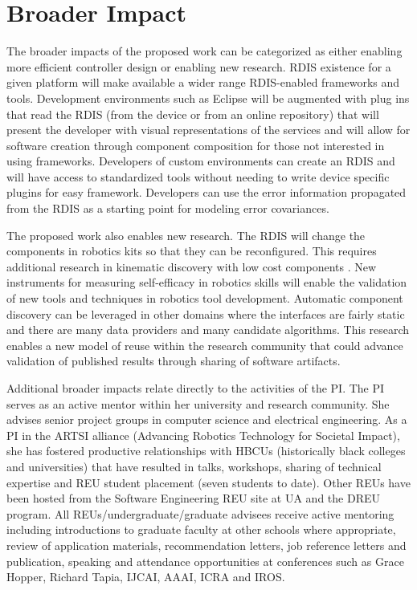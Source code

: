 
\section{Broader Impact}\label{sec:bi}

The broader impacts of the proposed work can be categorized as either enabling more efficient controller design or enabling new research.   RDIS existence for a given platform will make available a wider range RDIS-enabled frameworks and tools.  Development environments such as Eclipse will be augmented with plug ins that read the RDIS (from the device or from an online repository) that will present the developer with visual representations of the services and will allow for software creation through component composition for those not interested in using frameworks.  Developers of custom environments can create an RDIS and will have access to standardized tools without needing to write device specific plugins for easy framework.  Developers can use the error information propagated from the RDIS as a starting point for modeling error covariances.  

The proposed work also enables new research.  The RDIS will change the components in robotics kits so that they can be reconfigured.  This requires additional research in kinematic discovery with low cost components \cite{Croxell2008}.  New instruments for measuring self-efficacy in robotics skills will enable the validation of new tools and techniques in robotics tool development.  Automatic component discovery can be leveraged in other domains where the interfaces are fairly static and there are many data providers and many candidate algorithms.  This research enables a new model of reuse within the research community that could advance validation of published results through sharing of software artifacts. 

Additional broader impacts relate directly to the activities of the PI.  The PI serves as an active mentor within her university and research community.  She advises senior project groups in computer science and electrical engineering.  As a PI in the ARTSI alliance (Advancing Robotics Technology for Societal Impact), she has fostered productive relationships with HBCUs (historically black colleges and universities) that have resulted in talks, workshops, sharing of technical expertise and REU student placement (seven students to date).  Other REUs have been hosted from the Software Engineering REU site at UA and the DREU program. All REUs/undergraduate/graduate advisees receive active mentoring including introductions to graduate faculty at other schools where appropriate, review of application materials, recommendation letters, job reference letters and publication, speaking and attendance opportunities at conferences such as Grace Hopper, Richard Tapia, IJCAI, AAAI, ICRA and IROS.


